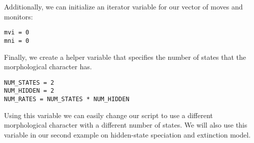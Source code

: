Additionally, we can initialize an iterator variable for our vector of moves and monitors:
{\tt \begin{snugshade*}
\begin{lstlisting}
mvi = 0
mni = 0
\end{lstlisting}
\end{snugshade*}}

Finally, we create a helper variable that specifies the number of states that the morphological character has.
{\tt \begin{snugshade*}
\begin{lstlisting}
NUM_STATES = 2
NUM_HIDDEN = 2
NUM_RATES = NUM_STATES * NUM_HIDDEN
\end{lstlisting}
\end{snugshade*}}
Using this variable we can easily change our script to use a different morphological character with a different number of states.
We will also use this variable in our second example on hidden-state speciation and extinction model. 



